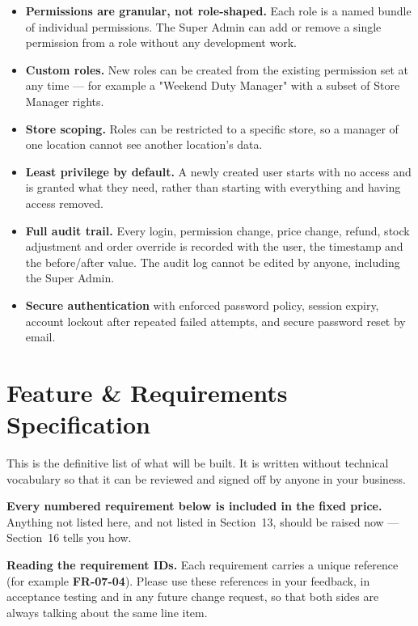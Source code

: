 \documentclass[11pt,a4paper]{article}
\begin{document}
\begin{itemize}
\item \textbf{Permissions are granular, not role-shaped.} Each role is a named bundle of
individual permissions. The Super Admin can add or remove a single permission from a role
without any development work.
\item \textbf{Custom roles.} New roles can be created from the existing permission set at
any time --- for example a "Weekend Duty Manager" with a subset of Store Manager rights.
\item \textbf{Store scoping.} Roles can be restricted to a specific store, so a manager
of one location cannot see another location's data.
\item \textbf{Least privilege by default.} A newly created user starts with no access and
is granted what they need, rather than starting with everything and having access removed.
\item \textbf{Full audit trail.} Every login, permission change, price change, refund,
stock adjustment and order override is recorded with the user, the timestamp and the
before/after value. The audit log cannot be edited by anyone, including the Super Admin.
\item \textbf{Secure authentication} with enforced password policy, session expiry,
account lockout after repeated failed attempts, and secure password reset by email.
\end{itemize}

\clearpage
\section{Feature \& Requirements Specification}

This is the definitive list of what will be built. It is written without technical
vocabulary so that it can be reviewed and signed off by anyone in your business.

\textbf{Every numbered requirement below is included in the fixed price.} Anything not
listed here, and not listed in Section~13, should be raised now --- Section~16 tells you
how.

\begin{keybox}
\textbf{Reading the requirement IDs.} Each requirement carries a unique reference
(for example \textbf{FR-07-04}). Please use these references in your feedback, in
acceptance testing and in any future change request, so that both sides are always
talking about the same line item.
\end{keybox}
\end{document}

